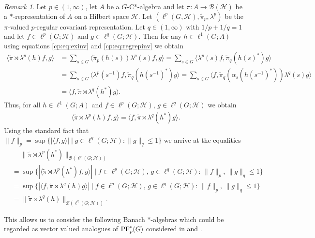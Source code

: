 \documentclass[12pt]{amsart}
\theoremstyle{definition}
\theoremstyle{remark}
\newtheorem{rem}[thm]{Remark}
\numberwithin{equation}{section}
\newcommand{\la}{\langle}
\newcommand{\ra}{\rangle}
\begin{document}
\begin{rem}
	Let $p\in (1,\infty)$, let $A$ be a  $G$-C*-algebra and let $\pi\colon A \to \mathcal{B}
	(\mathcal{H})$ be a $*$-representation of $A$ on
	a Hilbert space $\mathcal{H}$.  Let $(\ell^p(G,\mathcal{H}), \widetilde{\pi}_p, \lambda^p)$
	be the $\pi$-valued $p$-regular covariant representation.
	Let $q\in (1,\infty)$ with $1/p+1/q = 1$ and let $f\in \ell^p(G;\mathcal{H})$
	and $g\in \ell^q(G;\mathcal{H})$. Then for any $h\in \ell^1(G;A)$ using
	equations \eqref{cp:eq:exinv} and \eqref{cp:eq:regrepinv} we obtain
	\begin{align*}
		\langle \widetilde{\pi}\rtimes \lambda^p(h) f, g \rangle
		&= \sum_{s\in G} \langle \widetilde{\pi}_p(h(s)) \lambda^p(s) f,g \rangle
		= \sum_{s\in G}  \langle \lambda^p(s)f, \widetilde{\pi}_q(h(s)^*)g\rangle \\
		&= \sum_{s \in G}	 \langle \lambda^p(s^{-1})f,\widetilde{\pi}_q(h(s^{-1})^*)g\rangle
		= \sum_{s\in G}	\langle f, \widetilde{\pi}_q(\alpha_s(h(s^{-1})^*))\lambda^q(s)g \rangle \\
		&= \langle f, \widetilde{\pi}\rtimes \lambda^q(h^*) g \rangle.
	\end{align*}
	Thus, for all $h\in \ell^1(G;A)$ and $f\in \ell^p(G;\mathcal{H})$,
	$g\in \ell^q(G;\mathcal{H})$ we obtain
	\begin{align}
		\langle \widetilde{\pi}\rtimes \lambda^p(h) f, g \rangle
		= \langle f, \widetilde{\pi}\rtimes \lambda^q(h^*) g \rangle.
	\end{align}
Using the standard fact that $\|f\|_p=\sup\{|\la f,g\ra | \mid g\in \ell^q(G;\mathcal{H}): \|g\|_q\le 1\}$ we arrive at the equalities
	\begin{align*}
&\quad\;
\| \widetilde{\pi}\rtimes \lambda^p(h^*) \|_{\mathcal{B}(\ell^p(G;\mathcal{H}))}\\
&=
		\sup\lbrace |\langle \tilde{\pi}\rtimes \lambda^p(h^*)f,g\rangle| \mid
		f\in \ell^p(G;\mathcal{H}),\, g\in \ell^q(G; \mathcal{H}): \, \|f\|_p, \, \|g\|_q\leq 1
		\rbrace\\
		&= \sup\lbrace |\langle f,\tilde{\pi}\rtimes \lambda^q(h) g\rangle| \mid
		f\in \ell^p(G;\mathcal{H}),\, g\in \ell^q(G; \mathcal{H}): \, \|f\|_p, \, \|g\|_q\leq 1
		\rbrace
		\\
		& =\| \widetilde{\pi}\rtimes \lambda^q(h)\|_{\mathcal{B}(\ell^q(G;\mathcal{H}))}.
	\end{align*}
\end{rem}

This allows us to consider the following Banach $*$-algebras which could be regarded as vector valued analogues of $\textup{PF}^*_p(G)$ considered in \cite{SW1} and \cite{SW2}.
\end{document}

